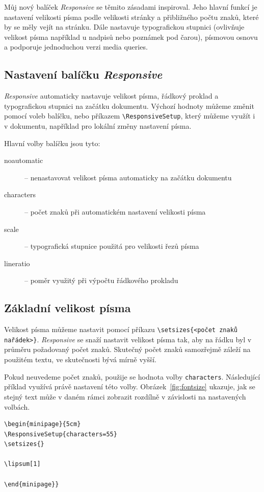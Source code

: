 \documentclass{csbulletin}
\newcommand\balicek[1]{\textit{#1}}
\begin{document}
Můj nový balíček \balicek{Responsive} se těmito zásadami inspiroval. 
Jeho hlavní funkcí je nastavení velikosti písma podle velikosti stránky
a přibližného počtu znaků, které by se měly vejít na stránku. 
Dále nastavuje typografickou stupnici (ovlivňuje velikost písma například 
u nadpisů nebo poznámek pod čarou), písmovou osnovu a podporuje
jednoduchou verzi media queries.

\subsection{Nastavení balíčku \balicek{Responsive}}

\balicek{Responsive} automaticky nastavuje velikost písma, řádkový proklad
a typografickou stupnici na začátku dokumentu. Výchozí hodnoty můžeme změnit
pomocí voleb balíčku, nebo příkazem \verb|\ResponsiveSetup|, který můžeme 
využít i v dokumentu, například pro lokální změny nastavení písma. 

Hlavní volby balíčku jsou tyto:

\begin{description}
  \item[noautomatic] – nenastavovat velikost písma automaticky na začátku dokumentu
  \item[characters] – počet znaků při automatickém nastavení velikosti písma
  \item[scale] –  typografická stupnice použitá pro velikosti řezů písma
  \item[lineratio] – poměr využitý při výpočtu řádkového prokladu
\end{description}

\subsection{Základní velikost písma}

Velikost písma můžeme nastavit pomocí příkazu \verb|\setsizes{<počet znaků na|\allowbreak\verb|řádek>}|. 
\balicek{Responsive} se snaží nastavit velikost písma tak, aby na řádku byl v průměru
požadovaný počet znaků. Skutečný počet znaků samozřejmě záleží na použitém textu, ve 
skutečnosti bývá mírně vyšší.

Pokud neuvedeme počet znaků, použije se hodnota volby \texttt{characters}.
Následující příklad využívá právě nastavení této volby. Obrázek~\ref{fig:fontsize} 
ukazuje, jak se stejný text může v daném rámci zobrazit rozdílně v závislosti na
nastavených volbách.

\begin{verbatim}
\begin{minipage}{5cm}
\ResponsiveSetup{characters=55}
\setsizes{}

\lipsum[1]

\end{minipage}}
\end{verbatim}
 
\end{document}
